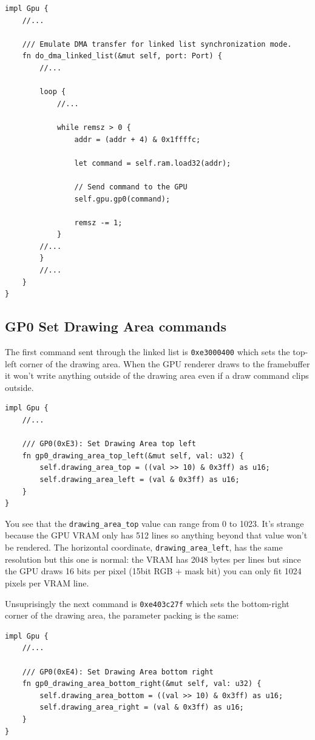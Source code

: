 \documentclass[a4paper]{article}
\newcommand{\code}[1] {\texttt{#1}}
\begin{document}
\begin{lstlisting}
impl Gpu {
    //...

    /// Emulate DMA transfer for linked list synchronization mode.
    fn do_dma_linked_list(&mut self, port: Port) {
        //...

        loop {
            //...

            while remsz > 0 {
                addr = (addr + 4) & 0x1ffffc;

                let command = self.ram.load32(addr);

                // Send command to the GPU
                self.gpu.gp0(command);

                remsz -= 1;
            }
	    //...
        }
        //...
    }
}
\end{lstlisting}

\subsection{GP0 Set Drawing Area commands}

The first command sent through the linked list is \code{0xe3000400}
which sets the top-left corner of the drawing area. When the GPU
renderer draws to the framebuffer it won't write anything outside of
the drawing area even if a draw command clips outside.

\begin{lstlisting}
impl Gpu {
    //...

    /// GP0(0xE3): Set Drawing Area top left
    fn gp0_drawing_area_top_left(&mut self, val: u32) {
        self.drawing_area_top = ((val >> 10) & 0x3ff) as u16;
        self.drawing_area_left = (val & 0x3ff) as u16;
    }
}
\end{lstlisting}

You see that the \code{drawing\_area\_top} value can range from 0 to
1023. It's strange because the GPU VRAM only has 512 lines so anything
beyond that value won't be rendered. The horizontal coordinate,
\code{drawing\_area\_left}, has the same resolution but this one is
normal: the VRAM has 2048 bytes per lines but since the GPU draws 16
bits per pixel (15bit RGB + mask bit) you can only fit 1024 pixels
per VRAM line.

Unsuprisingly the next command is \code{0xe403c27f} which sets the
bottom-right corner of the drawing area, the parameter packing is the
same:

\begin{lstlisting}
impl Gpu {
    //...

    /// GP0(0xE4): Set Drawing Area bottom right
    fn gp0_drawing_area_bottom_right(&mut self, val: u32) {
        self.drawing_area_bottom = ((val >> 10) & 0x3ff) as u16;
        self.drawing_area_right = (val & 0x3ff) as u16;
    }
}
\end{lstlisting}
\end{document}
